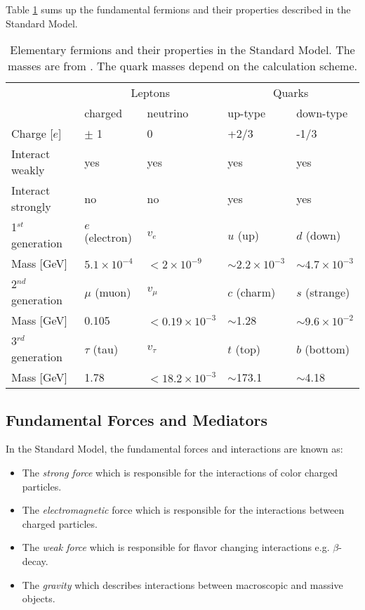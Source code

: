 Table \ref{table:Fermions} sums up the fundamental fermions and their properties described in the Standard Model.

\begin{table}[htb!]
  \centering
  \caption{Elementary fermions and their properties in the Standard Model. The masses are from \cite{Patrignani:2016xqp}. The quark masses depend on the calculation scheme.}
  \label{table:Fermions}
  \begin{tabular}{@{}lllll@{}} \toprule
    & \multicolumn{2}{c}{Leptons} & \multicolumn{2}{c}{Quarks} \\ \cmidrule(r){2-5}
    & charged & neutrino & up-type & down-type \\ \midrule
    Charge [$e$] & $\pm$ 1 & 0 & +2/3 & -1/3 \\
    Interact weakly & yes & yes & yes & yes \\
    Interact strongly & no & no & yes & yes \\ \midrule
    1$^{st}$ generation & $e$ (electron) & $v_e$ & $u$ (up) & $d$ (down) \\
    Mass [GeV] & $5.1 \times 10^{-4}$ & $< 2 \times 10^{-9}$ & $\sim 2.2 \times 10^{-3}$ & $\sim 4.7 \times 10^{-3}$\\ \midrule
    2$^{nd}$ generation & $\mu$ (muon) & $v_{\mu}$ & $c$ (charm) & $s$ (strange) \\
    Mass [GeV] & 0.105 & $< 0.19 \times 10^{-3}$ & $\sim$1.28 & $\sim 9.6 \times 10^{-2}$\\ \midrule
    3$^{rd}$ generation & $\tau$ (tau) & $v_{\tau}$ & $t$ (top) & $b$ (bottom) \\
    Mass [GeV] & 1.78 & $< 18.2 \times 10^{-3}$ & $\sim$173.1 & $\sim$4.18\\
    \bottomrule
  \end{tabular}
\end{table}

\subsection{Fundamental Forces and Mediators}
\label{subsec:Mediators}

In the Standard Model, the fundamental forces and interactions are known as:
\begin{itemize}
  \item The \textit{strong force} which is responsible for the interactions of color charged particles.
  \item The \textit{electromagnetic} force which is responsible for the interactions between charged particles.
  \item The \textit{weak force} which is responsible for flavor changing interactions e.g. $\beta$-decay.
  \item The \textit{gravity} which describes interactions between macroscopic and massive objects.
\end{itemize}


